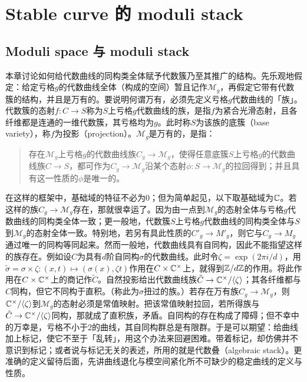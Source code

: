 
\section{Stable curve 的 moduli stack}
\subsection{Moduli space 与 moduli stack}

本章讨论如何给代数曲线的同构类全体赋予代数簇乃至其推广的结构。先乐观地假定：给定亏格$g$的代数曲线全体（构成的空间）暂且记作$\mathcal{M}_g$，再假定它带有代数簇的结构，并且是万有的。要说明何谓万有，必须先定义亏格$g$代数曲线的「族」。代数簇的态射$f:C\to S$称为$S$上亏格$g$代数曲线的族，是指$f$为紧合光滑态射，且各纤维都是连通的一维代数簇，其亏格均为$g$。此时称$S$为该族的底簇（base variety），称$f$为投影（projection）。$\mathcal{M}_g$是万有的，是指：

\begin{quote}
存在$\mathcal{M}_g$上亏格$g$的代数曲线族$C_g\to\mathcal{M}_g$，使得任意底簇$S$上亏格$g$的代数曲线族$C\to S$，都可作为$C_g\to\mathcal{M}_g$沿某个态射$\phi:S\to\mathcal{M}_g$的拉回得到；并且具有这一性质的$\phi$是唯一的。
\end{quote}

在这样的框架中，基础域的特征不必为$0$；但为简单起见，以下取基础域为$\mathbb{C}$。若这样的族$C_g\to\mathcal{M}_g$存在，那就很幸运了。因为由一点到$\mathcal{M}_g$的态射全体与亏格$g$代数曲线的同构类全体一致；更一般地，代数簇$S$上亏格$g$代数曲线的同构类全体与$S$到$\mathcal{M}_g$的态射全体一致。特别地，若另有具此性质的$C'_g\to M'_g$，则它与$C_g\to M_g$通过唯一的同构等同起来。然而一般地，代数曲线具有自同构，因此不能指望这样的族存在。例如设$C$为具有$d$阶自同构$\sigma$的代数曲线。此时令$\zeta=\exp(2\pi i/d)$，用$\tilde\sigma=\sigma\times\zeta:(x,t)\mapsto(\sigma(x),\zeta t)$作用在$C\times\mathbb{C}^\times$上，就得到$\mathbb{Z}/d\mathbb{Z}$的作用。将此作用在$C\times\mathbb{C}^\times$上的商记作$\tilde C$。自然投影给出代数曲线族$\tilde C\to\mathbb{C}^\times/\langle\zeta\rangle$；其各纤维都与$C$同构，但它不同构于直积。（称此为$\sigma$扭过的族。）若存在万有族$C_g\to\mathcal{M}_g$，则$\mathbb{C}^\times/\langle\zeta\rangle$到$\mathcal{M}_g$的态射必须是常值映射。把该常值映射拉回，若所得族与$\tilde C\to\mathbb{C}^\times/\langle\zeta\rangle$同构，那就成了直积族，矛盾。自同构的存在构成了障碍；但不幸中的万幸是，亏格不小于$2$的曲线，其自同构群总是有限群。于是可以期望：给曲线加上标记，使它不至于「乱转」，用这个办法来回避困难。带着标记，却仿佛并不意识到标记；或者说与标记无关的表述，所用的就是代数叠（algebraic stack）。更准确的定义留待后面，先讲曲线退化与模空间紧化所不可缺少的稳定曲线的定义与性质。

